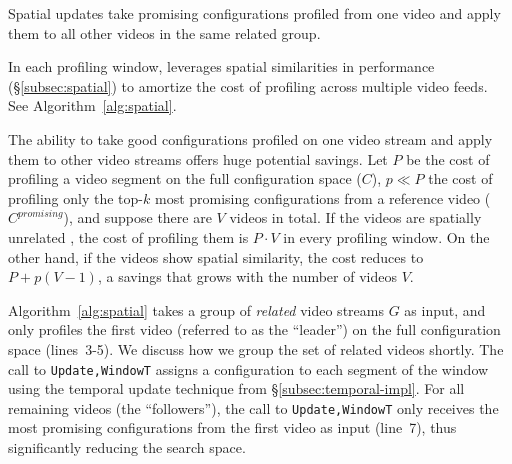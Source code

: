 \begin{algorithm}[t!]
	\DontPrintSemicolon
	\caption{Spatial updates take promising configurations profiled from one video and apply them to all other videos in the same related group.}
	\label{alg:spatial}
\end{algorithm}

In each profiling window, \name leverages spatial
similarities in \nn performance (\S\ref{subsec:spatial}) 
to amortize the cost of profiling across multiple video feeds. See 
Algorithm~\ref{alg:spatial}.

The ability to take good configurations profiled on one video stream and apply them 
to other video streams offers huge potential savings. Let $P$ be the cost of profiling a video segment on the full
configuration space ($C$), $p \ll P$ the cost of profiling only the top-$k$ most promising
configurations from a reference video ($C^{promising}$), and suppose there are $V$ videos in total.
If the videos are spatially unrelated , the cost of profiling them is $P\cdot V$ in
every profiling window. On the other hand, if the videos show spatial similarity, 
the cost reduces to $P + p(V-1)$, a savings that grows with the number of videos
$V$.

Algorithm~\ref{alg:spatial} takes a group of {\em related} video streams $G$ as input, and only profiles the first video (referred to as the ``leader'') on the full configuration space (lines~3-5). We discuss how we group the set of related videos shortly. The call to {\tt Update\sep WindowT} assigns a configuration to each segment of the window using the temporal update technique from \S\ref{subsec:temporal-impl}. 
For all remaining videos (the ``followers''), the call to {\tt Update\sep WindowT} only receives the most promising configurations from the first video as input (line~7), thus significantly reducing the search space.

